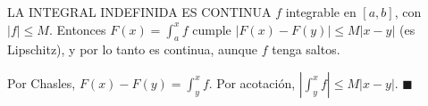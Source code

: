 \agregado
\begin{sello}{LA INTEGRAL INDEFINIDA ES CONTINUA}
$f$ integrable en $[a,b]$, con $|f|\le M$. Entonces $F(x)=\int_a^xf$ cumple $|F(x)-F(y)|\le M|x-y|$ (es Lipschitz), y por lo tanto es continua, aunque $f$ tenga saltos.
\end{sello}
\begin{demo}
Por Chasles, $F(x)-F(y)=\int_y^xf$. Por acotación, $\left|\int_y^xf\right|\le M|x-y|$. $\blacksquare$
\end{demo}

